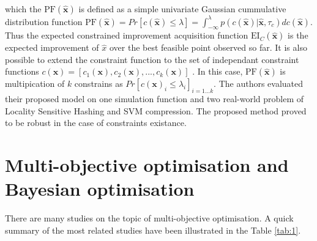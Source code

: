 which the $\mathrm{PF}(\hat{\textbf{x}})$ is defined as a simple univariate Gaussian cummulative distribution function $\mathrm{PF}(\hat{\textbf{x}}) = Pr[{c}(\hat{\textbf{x}}) \leq \lambda] = \int_{-\infty}^{\lambda} p(c(\hat{\textbf{x}})|\hat{\textbf{x}},\tau_c) dc(\hat{\textbf{x}})$. 
Thus the expected constrained improvement acquisition function $\mathrm{EI}_C(\hat{\textbf{x}})$ is the expected improvement of $\hat{x}$ over the best feasible point observed so far. It is also possible to extend the constraint function to the set of independant constraint functions $c(\textbf{x}) = [c_1(\textbf{x}), c_2(\textbf{x}),...,c_k(\textbf{x})]$ \cite{gardner2014bayesian}. In this case, $\mathrm{PF}(\hat{\textbf{x}})$ is multipication of $k$ constrains as $Pr[c(\textbf{x})_i \leq \lambda_i]_{i=1...k}$. The authors evaluated their proposed model on one simulation function and two real-world problem of Locality Sensitive Hashing and SVM‌ compression. The proposed method proved to be robust in the case of constraints existance.

\section{Multi-objective optimisation and Bayesian optimisation}
There are many studies on the topic of multi-objective optimisation. A quick summary of the most related studies have been illustrated in the Table \ref{tab:1}.

